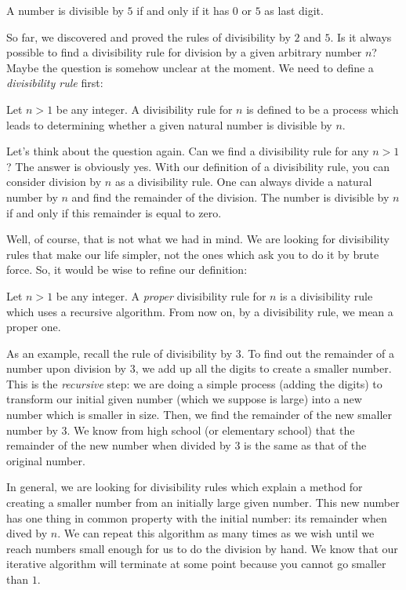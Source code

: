\documentclass{subfile}
\begin{document}
	\begin{proposition}[Divisibility by $5$]
		A number is divisible by $5$ if and only if it has $0$ or $5$ as last digit.
	\end{proposition}

So far, we discovered and proved the rules of divisibility by $2$ and $5$. Is it always possible to find a divisibility rule for division by a given arbitrary number $n$? Maybe the question is somehow unclear at the moment. We need to define a \textit{divisibility rule} first:

	\begin{definition}
		Let $n>1$ be any integer. A divisibility rule for $n$ is defined to be a process which leads to determining whether a given natural number is divisible by $n$.
	\end{definition}

Let's think about the question again. Can we find a divisibility rule for any $n>1$? The answer is obviously yes. With our definition of a divisibility rule, you can consider division by $n$ as a divisibility rule. One can always divide a natural number by $n$ and find the remainder of the division. The number is divisible by $n$ if and only if this remainder is equal to zero.

Well, of course, that is not what we had in mind. We are looking for divisibility rules that make our life simpler, not the ones which ask you to do it by brute force. So, it would be wise to refine our definition:

	\begin{definition}
		Let $n>1$ be any integer. A \textit{proper} divisibility rule for $n$ is a divisibility rule which uses a recursive algorithm. From now on, by a divisibility rule, we mean a proper one.
	\end{definition}

As an example, recall the rule of divisibility by $3$. To find out the remainder of a number upon division by $3$, we add up all the digits to create a smaller number. This is the \textit{recursive} step: we are doing a simple process (adding the digits) to transform our initial given number (which we suppose is large) into a new number which is smaller in size. Then, we find the remainder of the new smaller number by $3$. We know from high school (or elementary school) that the remainder of the new number when divided by $3$ is the same as that of the original number.

In general, we are looking for divisibility rules which explain a method for creating a smaller number from an initially large given number. This new number has one thing in common property with the initial number: its remainder when dived by $n$. We can repeat this algorithm as many times as we wish until we reach numbers small enough for us to do the division by hand. We know that our iterative algorithm will terminate at some point because you cannot go smaller than $1$.
\end{document}
